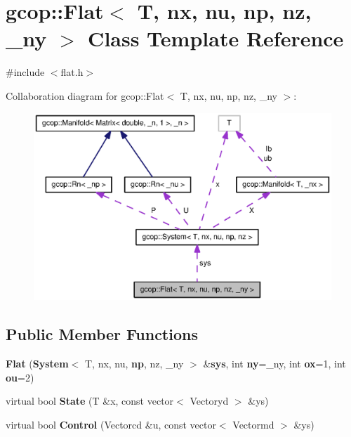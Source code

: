 \section{gcop\-:\-:\-Flat$<$ \-T, nx, nu, np, nz, \-\_\-ny $>$ \-Class \-Template \-Reference}
\label{classgcop_1_1Flat}


{\ttfamily \#include $<$flat.\-h$>$}



\-Collaboration diagram for gcop\-:\-:\-Flat$<$ \-T, nx, nu, np, nz, \-\_\-ny $>$\-:
\nopagebreak
\begin{figure}[H]
\begin{center}
\leavevmode
\includegraphics[width=350pt]{classgcop_1_1Flat__coll__graph}
\end{center}
\end{figure}
\subsection*{\-Public \-Member \-Functions}
\begin{DoxyCompactItemize}
\item 
{\bf \-Flat} ({\bf \-System}$<$ \-T, nx, nu, {\bf np}, nz, \-\_\-ny $>$ \&{\bf sys}, int {\bf ny}=\-\_\-ny, int {\bf ox}=1, int {\bf ou}=2)
\item 
virtual bool {\bf \-State} (\-T \&x, const vector$<$ \-Vectoryd $>$ \&ys)
\item 
virtual bool {\bf \-Control} (\-Vectorcd \&u, const vector$<$ \-Vectormd $>$ \&ys)
\end{DoxyCompactItemize}
